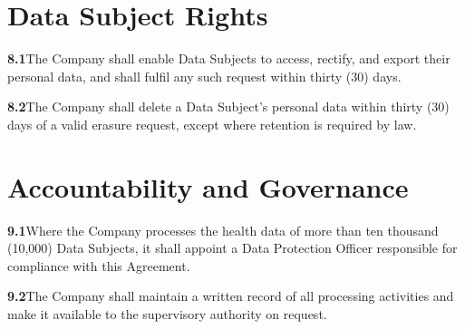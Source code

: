 \documentclass[acmsmall,nonacm]{acmart}
\newcommand{\clause}[2]{\par\smallskip\noindent\textbf{#1}\quad #2}
\begin{document}
\section{Data Subject Rights}
\clause{8.1}{The Company shall enable Data Subjects to access, rectify, and export their
personal data, and shall fulfil any such request within thirty (30) days.}
\clause{8.2}{The Company shall delete a Data Subject's personal data within thirty (30) days
of a valid erasure request, except where retention is required by law.}

\section{Accountability and Governance}
\clause{9.1}{Where the Company processes the health data of more than ten thousand (10,000)
Data Subjects, it shall appoint a Data Protection Officer responsible for compliance with
this Agreement.}
\clause{9.2}{The Company shall maintain a written record of all processing activities and
make it available to the supervisory authority on request.}
\end{document}
